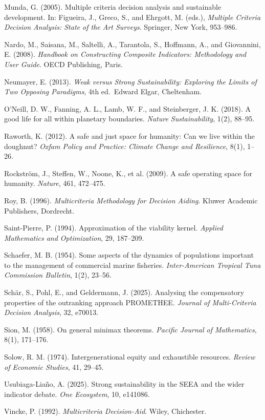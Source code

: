 \documentclass[3p,11pt]{elsarticle}
\begin{document}
Munda, G. (2005). Multiple criteria decision analysis and sustainable
development. In: Figueira, J., Greco, S., and Ehrgott, M. (eds.),
\emph{Multiple Criteria Decision Analysis: State of the Art Surveys}.
Springer, New York, 953--986.

Nardo, M., Saisana, M., Saltelli, A., Tarantola, S., Hoffmann, A., and Giovannini, E. (2008). \emph{Handbook on Constructing Composite Indicators: Methodology and User Guide}. OECD Publishing, Paris.

Neumayer, E. (2013). \emph{Weak versus Strong Sustainability: Exploring
the Limits of Two Opposing Paradigms}, 4th ed.~Edward Elgar, Cheltenham.

O'Neill, D. W., Fanning, A. L., Lamb, W. F., and Steinberger, J. K. (2018). A good life for all within planetary boundaries. \emph{Nature Sustainability}, 1(2), 88--95.

Raworth, K. (2012). A safe and just space for humanity: Can we live within the doughnut? \emph{Oxfam Policy and Practice: Climate Change and Resilience}, 8(1), 1--26.

Rockstr\"om, J., Steffen, W., Noone, K., et al. (2009). A safe operating
space for humanity. \emph{Nature}, 461, 472--475.

Roy, B. (1996). \emph{Multicriteria Methodology for Decision Aiding}.
Kluwer Academic Publishers, Dordrecht.

Saint-Pierre, P. (1994). Approximation of the viability kernel.
\emph{Applied Mathematics and Optimization}, 29, 187--209.

Schaefer, M. B. (1954). Some aspects of the dynamics of populations important to the management of commercial marine fisheries. \emph{Inter-American Tropical Tuna Commission Bulletin}, 1(2), 23--56.

Sch\"ar, S., Pohl, E., and Geldermann, J. (2025). Analysing the
compensatory properties of the outranking approach PROMETHEE.
\emph{Journal of Multi-Criteria Decision Analysis}, 32, e70013.

Sion, M. (1958). On general minimax theorems. \emph{Pacific Journal of
Mathematics}, 8(1), 171--176.

Solow, R. M. (1974). Intergenerational equity and exhaustible resources.
\emph{Review of Economic Studies}, 41, 29--45.

Usubiaga-Lia\~no, A. (2025). Strong sustainability in the SEEA and the
wider indicator debate. \emph{One Ecosystem}, 10, e141086.

Vincke, P. (1992). \emph{Multicriteria Decision-Aid}. Wiley, Chichester.
\end{document}
